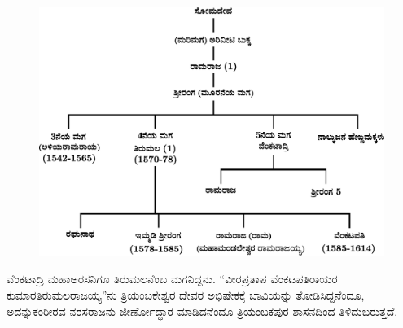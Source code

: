 \begin{figure}[H]
\includegraphics[scale=1.2]{images/chap3/chap3fig42.jpeg}
\end{figure}

\newpage

ವೆಂಕಟಾದ್ರಿ ಮಹಾಅರಸನಿಗೂ ತಿರುಮಲನೆಂಬ ಮಗನಿದ್ದನು. “ವೀರಪ್ರತಾಪ ವೆಂಕಟಪತಿರಾಯರ ಕುಮಾರ\break ತಿರುಮಲರಾಜಯ್ಯ”ನು ತ್ರಿಯಂಬಕೇಶ್ವರ ದೇವರ ಅಭಿಷೇಕಕ್ಕೆ ಬಾವಿಯನ್ನು ತೋಡಿಸಿದ್ದನೆಂದೂ, ಅದನ್ನು\break ಕಂಠೀರವ ನರಸರಾಜನು ಜೀರ್ಣೋದ್ಧಾರ ಮಾಡಿದನೆಂದೂ ತ್ರಿಯಂಬಕಪುರ ಶಾಸನದಿಂದ ತಿಳಿದುಬರುತ್ತದೆ.

